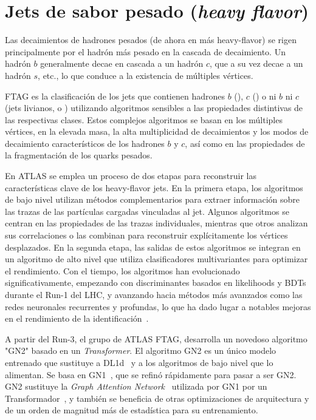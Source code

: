\section{Jets de sabor pesado (\textit{heavy flavor})}

Las decaimientos de hadrones pesados (de ahora en m\'as heavy-flavor) se rigen principalmente por el hadrón más pesado en la cascada de decaimiento. Un hadrón \(b\) generalmente decae en cascada a un hadrón \(c\), que a su vez decae a un hadrón \(s\), etc., lo que conduce a la existencia de múltiples vértices.

\ac{FTAG} es la clasificación de los jets que contienen hadrones \(b\) (\bjets), \(c\) (\cjets) o ni \(b\) ni \(c\) (jets livianos, o \ljets) utilizando algoritmos sensibles a las propiedades distintivas de las respectivas clases.
Estos complejos algoritmos se basan en los múltiples vértices, en la elevada masa, la alta multiplicidad de decaimientos y los modos de decaimiento característicos de los hadrones \(b\) y \(c\), así como en las propiedades de la fragmentación de los quarks pesados.


En \ac{ATLAS} se emplea un proceso de dos etapas para reconstruir las características clave de los heavy-flavor jets. En la primera etapa, los algoritmos de bajo nivel utilizan métodos complementarios para extraer información sobre las trazas de las partículas cargadas vinculadas al jet. Algunos algoritmos se centran en las propiedades de las trazas individuales, mientras que otros analizan sus correlaciones o las combinan para reconstruir explícitamente los vértices desplazados. En la segunda etapa, las salidas de estos algoritmos se integran en un algoritmo de alto nivel que utiliza clasificadores multivariantes para optimizar el rendimiento. Con el tiempo, los algoritmos han evolucionado significativamente, empezando con discriminantes basados en likelihoods y \acp{BDT} durante el Run-1 del \ac{LHC}, y avanzando hacia métodos más avanzados como las redes neuronales recurrentes y profundas, lo que ha dado lugar a notables mejoras en el rendimiento de la identificación~\cite{ATLAS-FTAG-Calibration-2012,ATLAS-FTAG-Efficiency-2012,MV2Algorithm,ATLAS-FTAG-DeepLearning}.

A partir del Run-3, el grupo de \ac{ATLAS} \ac{FTAG}, desarrolla un novedoso algoritmo "GN2" basado en un \textit{Transformer}. El algoritmo GN2 es un único modelo entrenado que sustituye a DL1d~\cite{ATLAS-FTAG-DL1-Run2} y a los algoritmos de bajo nivel que lo alimentan. Se basa en GN1~\cite{ATLAS-FTAG-GN1}, que se refinó rápidamente para pasar a ser GN2. GN2 sustituye la \textit{Graph Attention Network}~\cite{GANs} utilizada por GN1 por un Transformador~\cite{GN2Transformer}, y también se beneficia de otras optimizaciones de arquitectura y de un orden de magnitud más de estadística para su entrenamiento.

